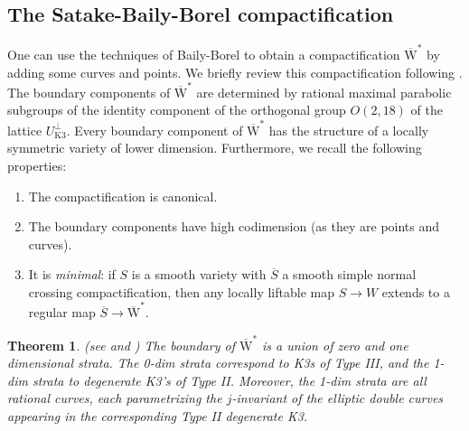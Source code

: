 \documentclass[11pt]{amsart}
\makeatletter
\newtheorem{theorem}{Theorem}[section]
\theoremstyle{definition}
\theoremstyle{remark}
\DeclareRobustCommand*{\mfaktor}[3][]
{
	{ \mathpalette{\mfaktor@impl@}{{#1}{#2}{#3}} }
}
\newcommand*{\mfaktor@impl@}[2]{\mfaktor@impl#1#2}
\newcommand*{\mfaktor@impl}[4]{
	\settoheight{\faktor@zaehlerhoehe}{\ensuremath{#1#2{#3}}}%
	\settoheight{\faktor@nennerhoehe}{\ensuremath{#1#2{#4}}}%
	\raisebox{-0.5\faktor@zaehlerhoehe}{\ensuremath{#1#2{#3}}}%
	\mkern-4mu\diagdown\mkern-5mu%
	\raisebox{0.5\faktor@nennerhoehe}{\ensuremath{#1#2{#4}}}%
}
\newcommand{\sbb}{\overline{\mathrm{W}}^{*}}
\newcommand{\go}{\mfaktor{\Gamma_U}{\Omega_U}}
\makeatother
\begin{document}
	
	\subsection{The Satake-Baily-Borel compactification}\label{sec:bb} One can use the techniques of Baily-Borel \cite{bb} to obtain a compactification $\sbb$ by adding some curves and points. We briefly review this compactification following  \cite[Section 3.1]{lazacpd}. The boundary components of $\sbb$ are determined
	by rational maximal parabolic subgroups of the identity component of the orthogonal group $O(2,18)$ of the lattice $U_{\textrm{K}3}^\perp$. Every boundary component of $\sbb$ has the structure of a locally symmetric variety of lower dimension. Furthermore, we recall the following properties:
	\begin{enumerate}
		\item The compactification is canonical.
		\item The boundary components have high codimension (as they are points and curves).
		\item It is \emph{minimal}: if $S$ is a smooth variety with $\overline{S}$ a smooth simple normal crossing compactification, then any locally liftable map $S \to W$ extends to a regular map $\overline{S} \to \sbb$.
	\end{enumerate}
	
	
	
	
	\begin{theorem}(see \cite[Section 2.3]{HT} and \cite{scattone}) The boundary of $\sbb$ is a union of zero and one dimensional strata. The 0-dim strata correspond to K3s of Type III, and the 1-dim strata to degenerate K3’s of Type II. Moreover, the 1-dim strata are all rational curves, each parametrizing the $j$-invariant of the elliptic double curves appearing in the corresponding Type II degenerate K3.  \end{theorem}
	
\end{document}
